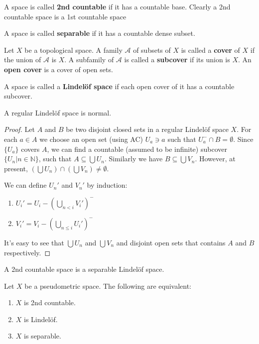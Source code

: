 \documentclass[12pt]{book}
\begin{document}
\begin{definition}
	A space is called {\bf 2nd countable} if it has a countable base. Clearly a 2nd countable space is a 1st countable space
\end{definition}
\begin{definition}
	A space is called {\bf separable} if it has a countable dense subset.
\end{definition}
\begin{definition}
	Let $X$ be a topological space. A family $\mathcal A$ of subsets of $X$ is called a {\bf cover} of $X$ if the union of $\mathcal A$ is $X$. A subfamily of $\mathcal A$ is called a {\bf subcover} if its union is $X$. An {\bf open cover} is a cover of open sets.
\end{definition}
\begin{definition}
	A space is called a {\bf Lindel\"of space} if each open cover of it has a countable subcover.
\end{definition}
\begin{theorem}
	A regular Lindel\"of space is normal.
\end{theorem}
\begin{proof}
	Let $A$ and $B$ be two disjoint closed sets in a regular Lindel\"of space $X$. For each $a\in A$ we choose an open set (using AC) $U_a\ni a$ such that $U_a^-\cap B=\emptyset$. Since $\{U_a\}$ covers $A$, we can find a countable (assumed to be infinite) subcover $\{U_n|n\in\mathbb N\}$, such that $A\subseteq \bigcup U_n$. Similarly we have $B\subseteq \bigcup V_n$. However, at present, $(\bigcup U_n)\cap(\bigcup V_n)\neq\emptyset$.
	
	We can define $U_n'$ and $V_n'$ by induction:
	\begin{enumerate}
		\item $U_i'=U_i-(\bigcup_{n<i}V_i')^-$
		\item $V_i'=V_i-(\bigcup_{n\leq i}U_i')^-$
	\end{enumerate}
	It's easy to see that $\bigcup U_n$ and $\bigcup V_n$ and disjoint open sets that contains $A$ and $B$ respectively.
\end{proof}

\begin{theorem}
	A 2nd countable space is a separable Lindel\"of space.
\end{theorem}
\begin{theorem}
	Let $X$ be a pseudometric space. The following are equivalent:
	\begin{enumerate}
		\item $X$ is 2nd countable.
		\item $X$ is Lindel\"of.
		\item $X$ is separable.
	\end{enumerate}
\end{theorem}
\end{document}
